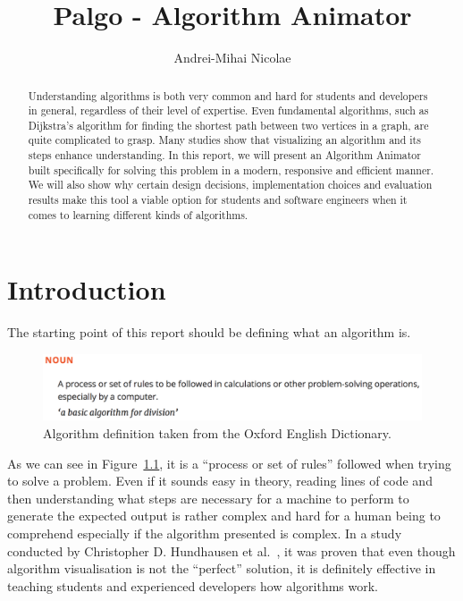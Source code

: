 \documentclass{l4proj}
\begin{document}
\title{Palgo - Algorithm Animator}
\author{Andrei-Mihai Nicolae}
\maketitle

\begin{abstract}
Understanding algorithms is both very common and hard for students and developers in general,
regardless of their level of expertise. Even fundamental algorithms, such as Dijkstra's algorithm
for finding the shortest path between two vertices in a graph, are quite complicated to grasp. Many
studies show that visualizing an algorithm and its steps enhance understanding. In
this report, we will present an Algorithm Animator built specifically for solving this problem
in a modern, responsive and efficient manner. We will also show why certain design decisions, implementation choices and
evaluation results make this tool a viable option for students and software engineers when it comes to learning different kinds of
algorithms.
\end{abstract}

\educationalconsent

\tableofcontents
\chapter{Introduction}
\label{intro}

The starting point of this report should be defining what an algorithm is.

\begin{figure}[!ht]
\centering
\includegraphics[scale=0.5]{algorithm}
\caption{Algorithm definition taken from the Oxford English Dictionary.}
\label{fig:algorithm}
\end{figure}

As we can see in Figure~\ref{fig:algorithm}, it is a ``process or set of rules'' followed when trying to solve a
problem. Even if it sounds easy in theory, reading lines of code and then understanding what steps are necessary for
a machine to perform to generate the expected output is rather complex and hard for a human being to
comprehend especially if the algorithm presented is complex. In a study conducted by Christopher D. Hundhausen et al.~\cite{av}, it was
proven that even though algorithm visualisation is not the ``perfect'' solution, it is definitely effective in teaching students and experienced developers how algorithms work.
\end{document}
